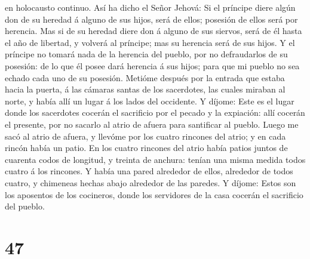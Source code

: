 en holocausto continuo.  Así ha dicho el Señor Jehová: Si
el príncipe diere algún don de su heredad á alguno de sus hijos, será de
ellos; posesión de ellos será por herencia.  Mas si de su
heredad diere don á alguno de sus siervos, será de él hasta el año de
libertad, y volverá al príncipe; mas su herencia será de sus hijos.
 Y el príncipe no tomará nada de la herencia del pueblo,
por no defraudarlos de su posesión: de lo que él posee dará herencia á
sus hijos; para que mi pueblo no sea echado cada uno de su posesión.
 Metióme después por la entrada que estaba hacia la puerta,
á las cámaras santas de los sacerdotes, las cuales miraban al norte, y
había allí un lugar á los lados del occidente.  Y díjome:
Este es el lugar donde los sacerdotes cocerán el sacrificio por el
pecado y la expiación: allí cocerán el presente, por no sacarlo al atrio
de afuera para santificar al pueblo.  Luego me sacó al
atrio de afuera, y llevóme por los cuatro rincones del atrio; y en cada
rincón había un patio.  En los cuatro rincones del atrio
había patios juntos de cuarenta codos de longitud, y treinta de anchura:
tenían una misma medida todos cuatro á los rincones.  Y
había una pared alrededor de ellos, alrededor de todos cuatro, y
chimeneas hechas abajo alrededor de las paredes.  Y díjome:
Estos son los aposentos de los cocineros, donde los servidores de la
casa cocerán el sacrificio del pueblo.

\hypertarget{section-46}{%
\section{47}\label{section-46}}

